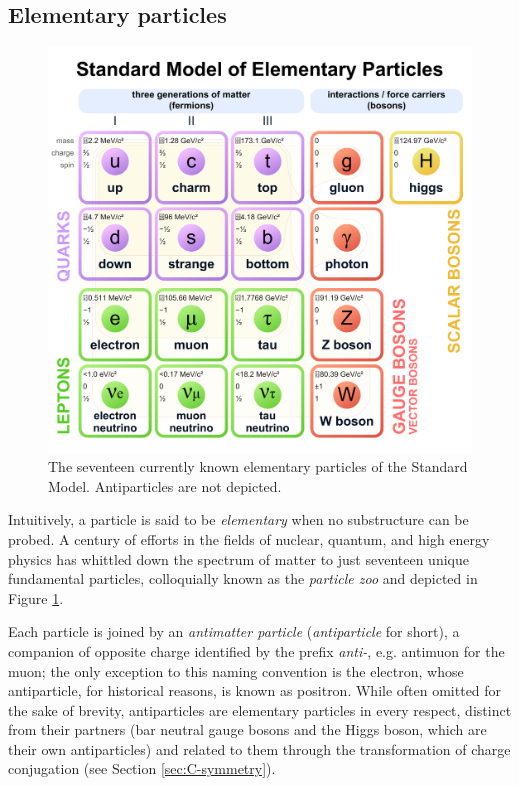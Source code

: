 \subsection{Elementary particles}
\begin{figure}[t!]
	\centering
	\includegraphics[scale=0.15]{graphics/01-standard_model/Standard_Model_of_Elementary_Particles.pdf}
	\caption[Currently known Standard Model elementary particles.]{The seventeen currently known elementary particles of the Standard Model. Antiparticles are not depicted.}
	\label{fig:particle_zoo}
\end{figure}

Intuitively, a particle is said to be \textit{elementary} when no substructure can be probed. 
A century of efforts in the fields of nuclear, quantum, and high energy physics has whittled down the spectrum of matter to just seventeen unique fundamental particles, colloquially known as the \textit{particle zoo} and depicted in Figure \ref{fig:particle_zoo}.

Each particle is joined by an \textit{antimatter particle} (\textit{antiparticle} for short), a companion of opposite charge identified by the prefix \textit{anti-}, e.g. antimuon for the muon; the only exception to this naming convention is the electron, whose antiparticle, for historical reasons, is known as positron.
While often omitted for the sake of brevity, antiparticles are elementary particles in every respect, distinct from their partners (bar neutral gauge bosons and the Higgs boson, which are their own antiparticles) and related to them through the transformation of charge conjugation (see Section \ref{sec:C-symmetry}).

